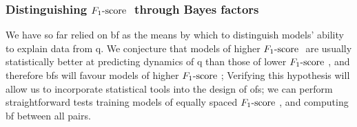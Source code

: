 \subsubsection{Distinguishing $ F_{1}\text{-score}  \ $ through Bayes factors}\label{sec:bf_by_f_score}
We have so far relied on \gls{bf} as the means by which to distinguish models' 
    ability to explain data from \gls{q}. 
We conjecture that models of higher $ F_{1}\text{-score}  \ $ are usually statistically better at predicting dynamics of \gls{q}
    than those of lower $ F_{1}\text{-score}  \ $, and therefore \glspl{bf} will favour models of higher $ F_{1}\text{-score}  \ $;
Verifying this hypothesis will allow us to incorporate statistical tools into the design of \glspl{of};
    we can perform straightforward tests training models of equally spaced $ F_{1}\text{-score}  \ $, and computing \acrshort{bf} between all pairs.
\par 

